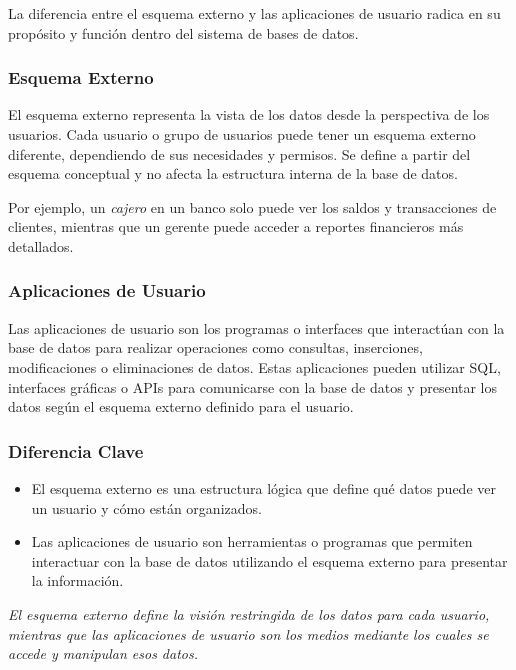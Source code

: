 \begin{enumerate}
    La diferencia entre el esquema externo y las aplicaciones de usuario radica en su propósito y función dentro del sistema de bases de datos.

    \subsubsection*{Esquema Externo}

    El esquema externo representa la vista de los datos desde la perspectiva de los usuarios. Cada usuario o grupo de usuarios puede tener un esquema externo diferente, dependiendo de sus necesidades y permisos. Se define a partir del esquema conceptual y no afecta la estructura interna de la base de datos.

    Por ejemplo, un \textit{cajero} en un banco solo puede ver los saldos y transacciones de clientes, mientras que un gerente puede acceder a reportes financieros más detallados.

    \subsubsection*{Aplicaciones de Usuario}

    Las aplicaciones de usuario son los programas o interfaces que interactúan con la base de datos para realizar operaciones como consultas, inserciones, modificaciones o eliminaciones de datos. Estas aplicaciones pueden utilizar SQL, interfaces gráficas o APIs para comunicarse con la base de datos y presentar los datos según el esquema externo definido para el usuario.

    \subsubsection*{Diferencia Clave}

    \begin{itemize}
        \item El esquema externo es una estructura lógica que define qué datos puede ver un usuario y cómo están organizados.
        \item Las aplicaciones de usuario son herramientas o programas que permiten interactuar con la base de datos utilizando el esquema externo para presentar la información.
    \end{itemize}

    \textit{El esquema externo define la visión restringida de los datos para cada usuario, mientras que las aplicaciones de usuario son los medios mediante los cuales se accede y manipulan esos datos.}


\end{enumerate}
